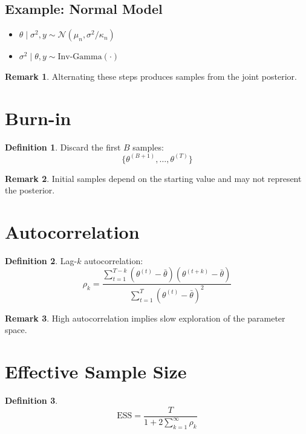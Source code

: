 \documentclass[12pt,oneside]{book}
\numberwithin{equation}{section}
\theoremstyle{definition}
\newtheorem{definition}{Definition}[section]
\newtheorem{remark}{Remark}[section]
\theoremstyle{plain}
\theoremstyle{remark}
\newcommand{\Normal}{\mathcal{N}}
\newcommand{\InvGam}{\mathrm{Inv\text{-}Gamma}}
\begin{document}
\subsection{Example: Normal Model}

\begin{itemize}
\item $\theta \mid \sigma^2, y \sim \Normal(\mu_n, \sigma^2/\kappa_n)$
\item $\sigma^2 \mid \theta, y \sim \InvGam(\cdot)$
\end{itemize}

\begin{remark}
Alternating these steps produces samples from the joint posterior.
\end{remark}

\section{Burn-in}

\begin{definition}
Discard the first $B$ samples:
$$
\{\theta^{(B+1)}, \dots, \theta^{(T)}\}
$$
\end{definition}

\begin{remark}
Initial samples depend on the starting value and may not represent the posterior.
\end{remark}

\section{Autocorrelation}

\begin{definition}
Lag-$k$ autocorrelation:
$$
\rho_k =
\frac{\sum_{t=1}^{T-k} (\theta^{(t)} - \bar{\theta})(\theta^{(t+k)} - \bar{\theta})}
{\sum_{t=1}^T (\theta^{(t)} - \bar{\theta})^2}
$$
\end{definition}

\begin{remark}
High autocorrelation implies slow exploration of the parameter space.
\end{remark}

\section{Effective Sample Size}

\begin{definition}
$$
\text{ESS}
=
\frac{T}{1 + 2\sum_{k=1}^{\infty} \rho_k}
$$
\end{definition}
\end{document}
